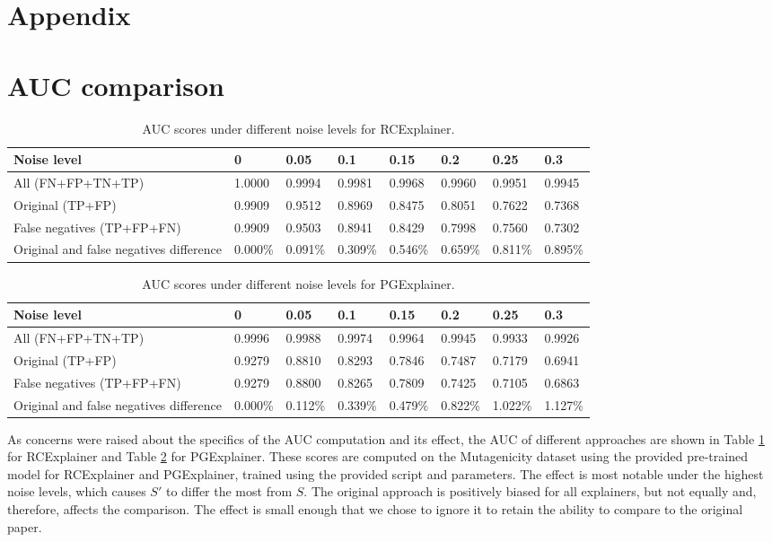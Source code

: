 \newpage
\section*{Appendix}

\section{AUC comparison}
\label{sec:appendix:auc}

\begin{table}[h!]
\caption{AUC scores under different noise levels for RCExplainer.}
\label{tab:appendix:auc_rcexplainer}
\centering
\begin{tabular}{ llllllll  }
 \toprule
Noise level &  0 & 0.05 & 0.1 & 0.15 & 0.2 & 0.25 & 0.3 \\
 \midrule
All (FN+FP+TN+TP) & 1.0000 & 0.9994 & 0.9981 & 0.9968 & 0.9960 & 0.9951 & 0.9945 \\
Original (TP+FP) & 0.9909 & 0.9512 & 0.8969 & 0.8475 & 0.8051 & 0.7622 & 0.7368 \\
False negatives (TP+FP+FN) & 0.9909 & 0.9503 & 0.8941 & 0.8429 & 0.7998 & 0.7560 & 0.7302 \\
Original and false negatives difference & 0.000\%& 0.091\%& 0.309\%& 0.546\%& 0.659\%& 0.811\%& 0.895\% \\
 \bottomrule
\end{tabular}
\end{table}

\begin{table}[h!]
\caption{AUC scores under different noise levels for PGExplainer.}
\label{tab:appendix:auc_pgexplainer}
\centering
\begin{tabular}{ llllllll  }
 \toprule
Noise level &  0 & 0.05 & 0.1 & 0.15 & 0.2 & 0.25 & 0.3 \\
 \midrule
All (FN+FP+TN+TP) & 0.9996 & 0.9988 & 0.9974 & 0.9964 & 0.9945 & 0.9933 & 0.9926 \\
Original (TP+FP) & 0.9279 & 0.8810 & 0.8293 & 0.7846 & 0.7487 & 0.7179 & 0.6941 \\
False negatives (TP+FP+FN) & 0.9279 & 0.8800 & 0.8265 & 0.7809 & 0.7425 & 0.7105 & 0.6863 \\
Original and false negatives difference & 0.000\%& 0.112\%& 0.339\%& 0.479\%& 0.822\%& 1.022\%& 1.127\% \\
 \bottomrule
 \end{tabular}
\end{table}


As concerns were raised about the specifics of the AUC computation and its effect, the AUC of different approaches are shown in Table \ref{tab:appendix:auc_rcexplainer} for RCExplainer and Table \ref{tab:appendix:auc_pgexplainer} for PGExplainer. These scores are computed on the Mutagenicity dataset using the provided pre-trained model for RCExplainer and PGExplainer, trained using the provided script and parameters. The effect is most notable under the highest noise levels, which causes $S'$ to differ the most from $S$. The original approach is positively biased for all explainers, but not equally and, therefore, affects the comparison. The effect is small enough that we chose to ignore it to retain the ability to compare to the original paper. 



